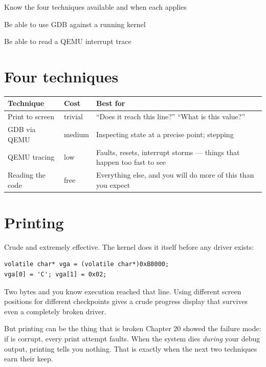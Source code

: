 \begin{goals}
  \item Know the four techniques available and when each applies
  \item Be able to use GDB against a running kernel
  \item Be able to read a QEMU interrupt trace
\end{goals}

\section{Four techniques}

\begin{center}
\begin{tabularx}{\textwidth}{@{}l l X@{}}
\toprule
\textbf{Technique} & \textbf{Cost} & \textbf{Best for} \\
\midrule
Print to screen & trivial & ``Does it reach this line?'' ``What is this value?'' \\
GDB via QEMU & medium & Inspecting state at a precise point; stepping \\
QEMU tracing & low & Faults, resets, interrupt storms --- things that happen too fast to see \\
Reading the code & free & Everything else, and you will do more of this than you expect \\
\bottomrule
\end{tabularx}
\end{center}

\section{Printing}

Crude and extremely effective. The kernel does it itself before any driver exists:

\begin{lstlisting}[style=c]
volatile char* vga = (volatile char*)0xB8000;
vga[0] = 'C'; vga[1] = 0x02;
\end{lstlisting}

Two bytes and you know execution reached that line. Using different screen positions for different
checkpoints gives a crude progress display that survives even a completely broken driver.

\begin{warn}{But printing can be the thing that is broken}
Chapter 20 showed the failure mode: if  is corrupt, every print attempt faults. When
the system dies \emph{during} your debug output, printing tells you nothing. That is exactly when
the next two techniques earn their keep.
\end{warn}

